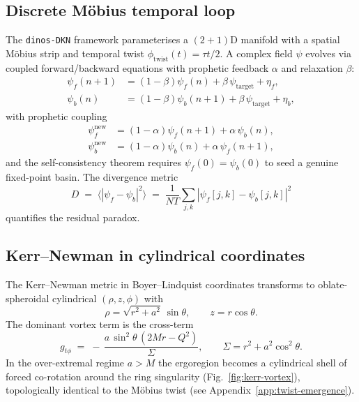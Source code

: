 \documentclass[11pt,a4paper]{article}
\theoremstyle{definition}
\theoremstyle{remark}
\newcommand{\psif}{\psi_{f}}
\newcommand{\psib}{\psi_{b}}
\newcommand{\psit}{\psi_{\mathrm{target}}}
\newcommand{\phitwist}{\phi_{\mathrm{twist}}}
\begin{document}
\subsection{Discrete M\"obius temporal loop}\label{sec:framework-mobius}
The \texttt{dinos-DKN} framework parameterises a $(2{+}1)$D manifold
with a spatial M\"obius strip and temporal twist
$\phitwist(t) = \tau t/2$. A complex field $\psi$ evolves via coupled
forward/backward equations with prophetic feedback $\alpha$ and
relaxation $\beta$:
\begin{align}
  \psif(n+1) &= (1-\beta)\psif(n) + \beta\,\psit + \eta_f, \label{eq:fwd}\\
  \psib(n)   &= (1-\beta)\psib(n+1) + \beta\,\psit + \eta_b, \label{eq:bwd}
\end{align}
with prophetic coupling
\begin{align}
  \psif^{\mathrm{new}} &= (1-\alpha)\psif(n+1) + \alpha\,\psib(n),
    \label{eq:pro-f}\\
  \psib^{\mathrm{new}} &= (1-\alpha)\psib(n) + \alpha\,\psif(n+1),
    \label{eq:pro-b}
\end{align}
and the self-consistency theorem requires $\psif(0) = \psib(0)$ to seed
a genuine fixed-point basin. The divergence metric
\begin{equation}\label{eq:D}
  D \;=\; \bigl\langle |\psif - \psib|^2 \bigr\rangle
    \;=\; \frac{1}{NT}\sum_{j,k} |\psif[j,k] - \psib[j,k]|^2
\end{equation}
quantifies the residual paradox.

\subsection{Kerr--Newman in cylindrical coordinates}\label{sec:kerr}
The Kerr--Newman metric in Boyer--Lindquist coordinates transforms to
oblate-spheroidal cylindrical $(\rho, z, \phi)$ with
\begin{equation}
  \rho = \sqrt{r^2 + a^2}\,\sin\theta, \qquad z = r\cos\theta.
\end{equation}
The dominant vortex term is the cross-term
\begin{equation}\label{eq:gtphi}
  g_{t\phi}
    \;=\; -\,\frac{a\,\sin^2\theta\,(2Mr - Q^2)}{\Sigma},
  \qquad \Sigma = r^2 + a^2\cos^2\theta.
\end{equation}
In the over-extremal regime $a > M$ the ergoregion becomes a
cylindrical shell of forced co-rotation around the ring singularity
(Fig.~\ref{fig:kerr-vortex}), topologically identical to the M\"obius
twist (see Appendix~\ref{app:twist-emergence}).
\end{document}
